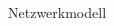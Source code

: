 %				

\begin{frame}[fragile]{Netzwerkmodell}
	\vspace{-0.45cm}%
	\begin{center}%
		\begin{adjustbox}{width=\textwidth,height=0.9\textheight, keepaspectratio}
		\end{adjustbox}
	\end{center}%
\end{frame}